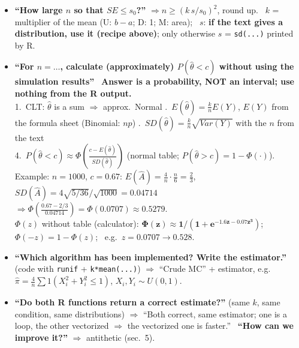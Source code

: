 \documentclass[10pt]{article}
\newcommand{\R}[1]{\texttt{#1}}
\newcommand{\always}{\textcolor{always}{$\bullet$}}
\newcommand{\Q}[1]{\textbf{``#1''}}
\renewcommand{\section}[1]{\par\vspace{8pt}{\large\bfseries\color{head}#1}\par\vspace{1pt}{\color{head}\hrule}\vspace{3pt}}
\begin{document}
\begin{itemize}
\item \Q{How large $n$ so that $SE\le s_0$?} $\Rightarrow n\ge (k\,s/s_0)^2$, round up. \ $k$ = multiplier of the mean (U: $b-a$; D: 1; M: area); \ $s$: \textbf{if the text gives a distribution, use it (recipe above)}; only otherwise $s$ = \R{sd(...)} printed by R.
\item \Q{For $n=\dots$, calculate (approximately) $P(\hat\theta<c)$ without using the simulation results} \ \textbf{Answer is a probability, NOT an interval; use nothing from the R output.}\\
\hspace*{1em}1.\ CLT: $\hat\theta$ is a sum $\Rightarrow$ approx.\ Normal .\ $E(\hat\theta)=\frac kn E(Y)$, $E(Y)$ from the formula sheet (Binomial: $np$) .\ $SD(\hat\theta)=\frac kn\sqrt{Var(Y)}$ with the $n$ from the text\\
\hspace*{1em}4.\ $P(\hat\theta<c)\approx\Phi\!\left(\frac{c-E(\hat\theta)}{SD(\hat\theta)}\right)$ (normal table; $P(\hat\theta>c)=1-\Phi(\cdot)$).\\
\hspace*{1em}Example: $n=1000$, $c=0.67$: $E(\hat A)=\frac4n\cdot\frac n6=\frac23$, $SD(\hat A)=4\sqrt{5/36}/\sqrt{1000}=0.04714$ $\Rightarrow\Phi\!\left(\frac{0.67-2/3}{0.04714}\right)=\Phi(0.0707)\approx\mathbf{0.5279}$.\\
\hspace*{1em}$\Phi(z)$ without table (calculator): $\mathbf{\Phi(z)\approx1/(1+e^{-1.6z-0.07z^3})}$; \ $\Phi(-z)=1-\Phi(z)$; \ e.g.\ $z=0.0707\to0.528$.
\item \Q{Which algorithm has been implemented? Write the estimator.} (code with \R{runif} + \R{k*mean(...)}) $\Rightarrow$ ``Crude MC'' + estimator, e.g.\ $\hat\pi=\frac4n\sum 1(X_i^2+Y_i^2\le1)$, $X_i,Y_i\sim U(0,1)$.
\item \Q{Do both R functions return a correct estimate?} (same $k$, same condition, same distributions) $\Rightarrow$ ``Both correct, same estimator; one is a loop, the other vectorized $\Rightarrow$ the vectorized one is faster.'' \ \Q{How can we improve it?} $\Rightarrow$ antithetic (sec.\ 5).
\end{itemize}

\section{\always{} 4. Importance sampling}
\end{document}
